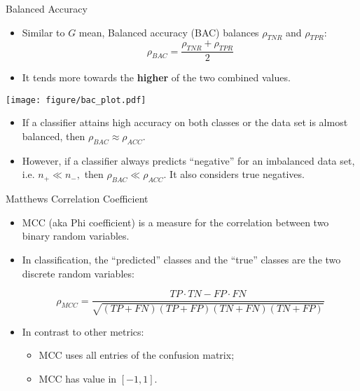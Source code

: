 \documentclass[11pt,compress,t,notes=noshow, xcolor=table]{beamer}
\begin{document}
\begin{vbframe}{Balanced Accuracy}
	\footnotesize
	
	\begin{minipage}[c]{0.5\textwidth}
		\footnotesize
		\begin{itemize}
			\item Similar to $G$ mean, Balanced accuracy (BAC) balances $\rho_{TNR}$ and $\rho_{TPR}$: 
			$$\rho_{BAC} = \frac{\rho_{TNR} + \rho_{TPR}}{2}$$
			\item  It tends more towards the \textbf{higher} of the two combined values.
		\end{itemize}
	\end{minipage}%
	\begin{minipage}[c]{0.5\textwidth}
		\centering
		\texttt{[image: figure/bac\_plot.pdf]}
	\end{minipage}
	\begin{itemize}
		\item If a classifier attains high accuracy on both classes or the data set is almost balanced, then $\rho_{BAC} \approx \rho_{ACC}$.
        \vspace{20pt}
        
		\item However, if a classifier always predicts ``negative'' for an imbalanced data set, i.e. $n_+  \ll n_-,$ then $\rho_{BAC} \ll \rho_{ACC}$. It also considers true negatives.

	\end{itemize}
	
\end{vbframe}


\begin{vbframe}{Matthews Correlation Coefficient}
	\footnotesize{
	\begin{itemize}
		\item MCC (aka Phi coefficient) is a measure for the correlation between two binary random variables. 
        \vspace{20pt}
  
        \item In classification, the ``predicted'' classes and the ``true'' classes are the two discrete random variables:
	
		$$   \rho_{MCC} = \frac{TP\cdot TN - FP \cdot FN}{\sqrt{(TP+FN)(TP+FP)(TN+FN)(TN+FP)}}$$
        \vspace{20pt}

        \item In contrast to other metrics: 
        \begin{itemize}
            \footnotesize
            \item MCC uses all entries of the confusion matrix;
            \item MCC has value in $[-1,1]$.
        \end{itemize}
		
    \end{itemize}
	
	}
\end{vbframe}
\end{document}
